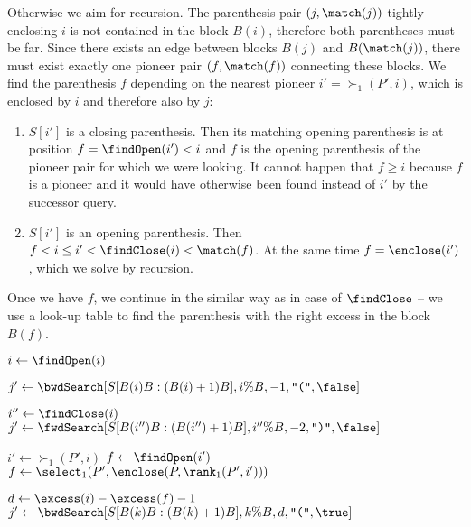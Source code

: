 Otherwise we aim for recursion.
The parenthesis pair $(j, \match(j))$ tightly enclosing $i$ is not contained in the block $B(i)$, therefore both parentheses must be far.
Since there exists an edge between blocks $B(j)$ and $B(\match(j))$, there must exist exactly one pioneer pair $(f, \match(f))$ connecting these blocks.
We find the parenthesis $f$ depending on the nearest pioneer $i' = \succ_1(P', i)$, which is enclosed by $i$ and therefore also by $j$:
\begin{enumerate}
	\item $S[i']$ is a closing parenthesis.
	Then its matching opening parenthesis is at position $f = \findOpen(i') < i$ and $f$ is the opening parenthesis of the pioneer pair for which we were looking.
	It cannot happen that $f \ge i$ because $f$ is a pioneer and it would have otherwise been found instead of $i'$ by the successor query.
	\item $S[i']$ is an opening parenthesis.
	Then $f < i \le i' < \findClose(i) < \match(f)$.
	At the same time $f = \enclose(i')$, which we solve by recursion.
\end{enumerate}
Once we have $f$, we continue in the similar way as in case of $\findClose$ -- we use a look-up table to find the parenthesis with the right excess in the block $B(f)$.

\begin{algorithm}
\begin{algorithmic}
		\State $i \gets \findOpen(i)$
	\EndIf

	\State $j' \gets \bwdSearch[S[B(i)B : (B(i)+1) B], i \% B, -1, \openingParen, \false]$
		\State {} 
	\EndIf
	
	\State $i'' \gets \findClose(i)$
	\State $j' \gets \fwdSearch[S[B(i'')B : (B(i'')+1) B], i'' \% B, -2, \closingParen, \false]$
		\State {} 
	\EndIf
	
	\State

	\State $i' \gets \succ_1(P', i)$
		\State $f \gets \findOpen(i')$
	\Else
		\State $f \gets \select_1(P', \enclose(P, \rank_1(P', i')))$ 
	\EndIf
	
	\State $d \gets \excess(i) - \excess(f) - 1$
	\State $j' \gets \bwdSearch[S[B(k)B: (B(k) + 1)B], k \% B, d, \openingParen, \true]$
	\State {}
\EndFunction
\end{algorithmic}
\end{algorithm}

